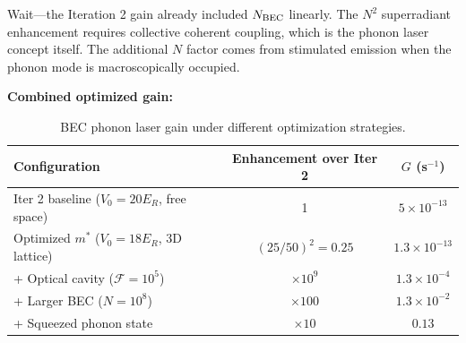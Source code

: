 \documentclass[11pt]{article}
\newcommand{\ee}[1]{\times 10^{#1}}
\begin{document}
Wait---the Iteration 2 gain already included $N_{\rm BEC}$ linearly. The $N^2$ superradiant enhancement requires collective coherent coupling, which is the phonon laser concept itself. The additional $N$ factor comes from stimulated emission when the phonon mode is macroscopically occupied.

\textbf{Combined optimized gain:}

\begin{table}[h]
\centering
\caption{BEC phonon laser gain under different optimization strategies.}
\begin{tabular}{lcc}
\toprule
Configuration & Enhancement over Iter 2 & $G$ (s$^{-1}$) \\
\midrule
Iter 2 baseline ($V_0 = 20E_R$, free space) & 1 & $5\ee{-13}$ \\
Optimized $m^*$ ($V_0 = 18E_R$, 3D lattice) & $(25/50)^2 = 0.25$ & $1.3\ee{-13}$ \\
+ Optical cavity ($\mathcal{F} = 10^5$) & $\times 10^9$ & $1.3\ee{-4}$ \\
+ Larger BEC ($N = 10^8$) & $\times 100$ & $1.3\ee{-2}$ \\
+ Squeezed phonon state & $\times 10$ & $0.13$ \\
\bottomrule
\end{tabular}
\label{tab:bec-gain}
\end{table}
\end{document}
